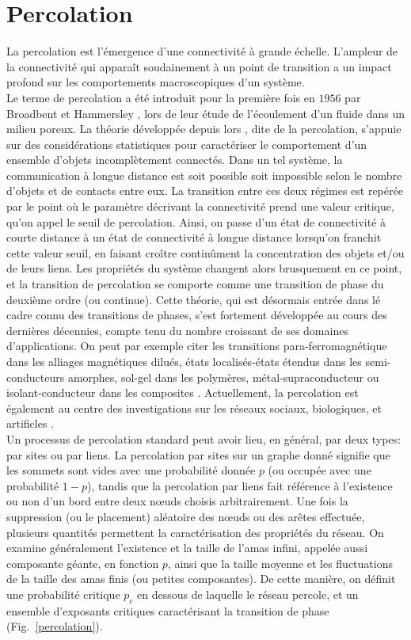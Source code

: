 \section{Percolation}
La percolation est l'émergence d'une connectivité à grande échelle. L'ampleur de la connectivité qui apparaît soudainement à un point de transition a un impact profond sur les comportements macroscopiques d'un système.\\
Le terme de percolation a  été introduit pour la première fois  en $1956$ par Broadbent et Hammersley \cite{Broadbent-Hammersley1957}, lors  de leur étude de l'écoulement d'un fluide  dans  un milieu poreux. La théorie développée depuis lors , dite de la percolation, s'appuie sur des considérations statistiques pour caractériser le comportement d'un ensemble d'objets incomplètement connectés. Dans un  tel système, la communication à longue distance est soit possible soit impossible selon le nombre d'objets et de contacts entre eux. La transition entre ces deux régimes est repérée par le point où  le paramètre décrivant la connectivité prend une valeur critique, qu'on appel le seuil  de percolation. Ainsi, on passe d'un  état de connectivité à courte distance à un état de connectivité à longue distance lorsqu'on franchit cette valeur seuil, en faisant croître continûment la concentration des objets et/ou de leurs liens. Les propriétés du système changent alors brusquement en ce point, et  la transition de percolation se comporte comme une transition de phase du deuxième ordre (ou continue). Cette théorie, qui est désormais entrée dans lé cadre connu des transitions de phases, s'est fortement développée au cours des dernières décennies, compte tenu  du nombre croissant de  ses domaines d'applications. On peut par exemple citer les transitions para-ferromagnétique dans les alliages magnétiques dilués, états localisés-états étendus dans les semi-conducteurs amorphes, sol-gel dans les polymères, métal-supraconducteur ou isolant-conducteur dans les composites \cite{Stauffer1982}. Actuellement, la percolation est également au centre des investigations sur les réseaux sociaux, biologiques, et artificles \cite{Newman-al2002,Dorogovtsev-al2008,Rozenfeld-al2010}.\\
Un processus de percolation standard peut avoir lieu, en général, par deux types: par sites ou par liens. La percolation par sites sur un graphe donné signifie que les sommets sont vides avec une probabilité donnée $p$ (ou occupée avec une probabilité $1-p$), tandis que la percolation par liens fait référence à l’existence ou non d’un bord entre deux nœuds choisis arbitrairement. Une fois la suppression (ou le placement) aléatoire des nœuds ou des arêtes effectuée, plusieurs quantités permettent la caractérisation des propriétés du réseau.
On examine généralement l’existence et la taille de l'amas infini, appelée aussi composante géante, en fonction $p$, ainsi que la taille moyenne et les fluctuations de la taille des amas finis (ou petites composantes). De cette manière, on définit une probabilité critique $p_c$ en dessous de laquelle le réseau percole, et un ensemble d’exposants critiques caractérisant la transition de phase (Fig.~\ref{percolation}).

